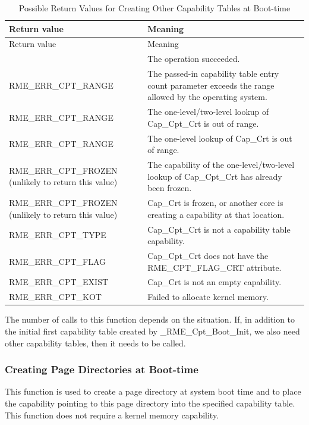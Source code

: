 \begin{xltabular}{\textwidth}{@{}>{\hsize\raggedright\arraybackslash}X>{\hsize\raggedright\arraybackslash}X@{}}
\caption{Possible Return Values for Creating Other Capability Tables at Boot-time}\label{tab:7-44-create-other-capability-tables-at-boot-return-values}\\
\toprule
Return value & Meaning\tabularnewline
\endfirsthead
\toprule
Return value & Meaning\tabularnewline
\midrule
\endhead
\bottomrule
{} & The operation succeeded.\tabularnewline
    RME\_ERR\_CPT\_RANGE & The passed-in capability table entry count parameter exceeds the range allowed by the operating system.\tabularnewline
    RME\_ERR\_CPT\_RANGE & The one-level/two-level lookup of Cap\_Cpt\_Crt is out of range.\tabularnewline
    RME\_ERR\_CPT\_RANGE & The one-level lookup of Cap\_Crt is out of range.\tabularnewline
    RME\_ERR\_CPT\_FROZEN (unlikely to return this value) & The capability of the one-level/two-level lookup of Cap\_Cpt\_Crt has already been frozen.\tabularnewline
    RME\_ERR\_CPT\_FROZEN (unlikely to return this value) & Cap\_Crt is frozen, or another core is creating a capability at that location.\tabularnewline
    RME\_ERR\_CPT\_TYPE & Cap\_Cpt\_Crt is not a capability table capability.\tabularnewline
    RME\_ERR\_CPT\_FLAG & Cap\_Cpt\_Crt does not have the RME\_CPT\_FLAG\_CRT attribute.\tabularnewline
    RME\_ERR\_CPT\_EXIST & Cap\_Crt is not an empty capability.\tabularnewline
    RME\_ERR\_CPT\_KOT & Failed to allocate kernel memory.\tabularnewline
\end{xltabular}
\nopagebreak[4]

The number of calls to this function depends on the situation. If, in addition to the initial first capability table created by \_RME\_Cpt\_Boot\_Init, we also need other capability tables, then it needs to be called.

\subsubsection{Creating Page Directories at Boot-time}\label{subsubsec:7-create-page-directory-at-boot}

This function is used to create a page directory at system boot time and to place the capability pointing to this page directory into the specified capability table. This function does not require a kernel memory capability.

